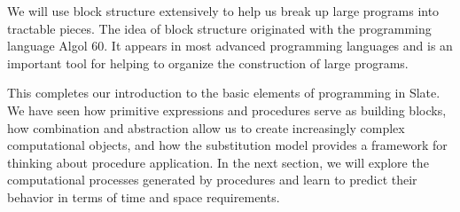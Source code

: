 We will use block structure extensively to help us break up large programs into tractable pieces. The idea of block structure originated with the programming language Algol 60. It appears in most advanced programming languages and is an important tool for helping to organize the construction of large programs.

\bigskip

This completes our introduction to the basic elements of programming in Slate. We have seen how primitive expressions and procedures serve as building blocks, how combination and abstraction allow us to create increasingly complex computational objects, and how the substitution model provides a framework for thinking about procedure application. In the next section, we will explore the computational processes generated by procedures and learn to predict their behavior in terms of time and space requirements.